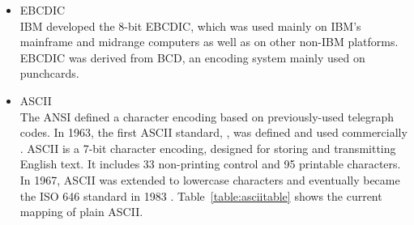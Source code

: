 \documentclass[a4paper, 12pt]{scrartcl} %
\begin{document}
\begin{itemize}
  \item{\gls{EBCDIC}} \\
    IBM developed the 8-bit \gls{EBCDIC}, which was used mainly on IBM's
    mainframe and midrange computers as well as on other non-IBM platforms.
    \gls{EBCDIC} was derived from \gls{BCD}, an encoding system mainly used on
    \glspl{punchcard}.
  \item{\gls{ASCII}} \\
    The \gls{ANSI} defined a character encoding based on previously-used
    telegraph codes. In 1963, the first \gls{ASCII} standard, ,
    was defined and used commercially \cite{brandle1999ascii}. \gls{ASCII} is a
    7-bit character encoding, designed for storing and transmitting English
    text. It includes 33 non-printing control and 95 printable characters. In
    1967, \gls{ASCII} was extended to lowercase characters and eventually
    became the ISO 646 standard in 1983 \cite{haralambous2007fonts}.
    Table~\ref{table:asciitable} shows the current mapping of plain
    \gls{ASCII}. \\
    \begin{table}[H]
      \begin{center}
\end{center}
\end{table}
\end{itemize}
\end{document}
